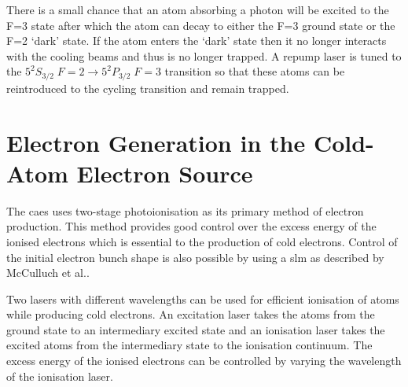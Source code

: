 There is a small chance that an atom absorbing a photon will be excited to the F=3 state after which the atom can decay to either the F=3 ground state or the F=2 `dark' state. If the atom enters the `dark' state then it no longer interacts with the cooling beams and thus is no longer trapped. A repump laser is tuned to the $5 ^2 S_{3/2}\;F=2\rightarrow5 ^2 P_{3/2}\;F=3$ transition so that these atoms can be reintroduced to the cycling transition and remain trapped.

\section{Electron Generation in the Cold-Atom Electron Source}
The \gls{caes} uses two-stage photoionisation as its primary method of electron production. This method provides good control over the excess energy of the ionised electrons which is essential to the production of cold electrons. Control of the initial electron bunch shape is also possible by using a \gls{slm} as described by McCulluch et al.\cite{mcculloch_arbitrarily_2011}.

Two lasers with different wavelengths can be used for efficient ionisation of atoms while producing cold electrons. An excitation laser takes the atoms from the ground state to an intermediary excited state and an ionisation laser takes the excited atoms from the intermediary state to the ionisation continuum. The excess energy of the ionised electrons can be controlled by varying the wavelength of the ionisation laser.

